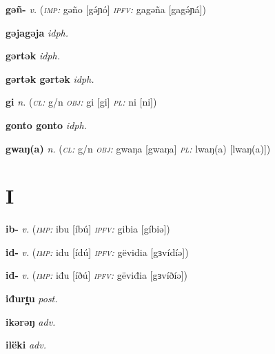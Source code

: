 \newentry
\headword\textbf{gəñ-}
\ipa{[gə́ɲ-]}
\synpos\textit{v.} 
\imperative(\textit {\textsc{imp:}} gəño [gə́ɲó] 
\imperfective\textit{\textsc{ipfv:}} gagəña [gagə́ɲá])

\newentry
\headword\textbf{gəjagəja}
\ipa{[gəjagəja]}
\synpos\textit{idph.} 

\newentry
\headword\textbf{gərtək}
\ipa{[gərtək]}
\synpos\textit{idph.} 

\newentry
\headword\textbf{gərtək gərtək}
\synpos\textit{idph.} 

\newentry
\headword\textbf{gi}  
\ipa{[gi]}
\synpos\textit{n.} 
\class(\textit{\textsc{cl:}} {g/n}
\object\textit{\textsc{obj:}} gi [gi]
\plural\textit{\textsc{pl:}} ni [ni])

\newentry
\headword\textbf{gonto gonto}
\synpos\textit{idph.} 

\newentry
\headword\textbf{gwaŋ(a)}  
\ipa{[gwaŋ(a)]}
\synpos\textit{n.} 
\class(\textit{\textsc{cl:}} {g/n}
\object\textit{\textsc{obj:}} gwaŋa [gwaŋa]
\plural\textit{\textsc{pl:}} lwaŋ(a) [lwaŋ(a)])

\section*{I}\label{I}

\newentry
\headword\textbf{ib-}
\ipa{[íb-]}
\synpos\textit{v.} 
\imperative(\textit {\textsc{imp:}} ibu [íbú] 
\imperfective\textit{\textsc{ipfv:}} gibia [gíbiə])

\newentry
\headword\textbf{id-}
\ipa{[id-]}
\synpos\textit{v.} 
\imperative(\textit {\textsc{imp:}} idu [ídú] 
\imperfective\textit{\textsc{ipfv:}} gëvidia [gɜvídíə])

\newentry
\headword\textbf{iđ-}
\ipa{[ið-]}
\synpos\textit{v.} 
\imperative(\textit {\textsc{imp:}} iđu [íðú] 
\imperfective\textit{\textsc{ipfv:}} gëviđia [gɜvíðíə])

\newentry
\headword\textbf{iđurt̪u}
\ipa{[iðurt̪u]}
\synpos\textit{post.} 

\newentry
\headword\textbf{ikərəŋ}
\ipa{[ikərəŋ]}
\synpos\textit{adv.} 

\newentry
\headword\textbf{ilëki}
\ipa{[ilɜ́ki]}
\synpos\textit{adv.} 


